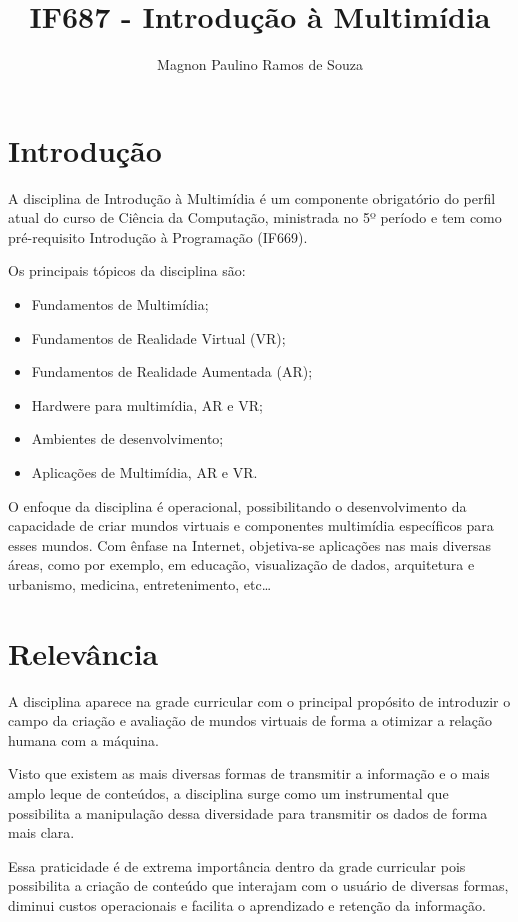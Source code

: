 \documentclass[a4paper]{article}
\title{IF687 - Introdução à Multimídia}
\author{Magnon Paulino Ramos de Souza}
\begin{document}
\maketitle

\section{Introdução}

A disciplina de Introdução à Multimídia\cite{st} é um componente obrigatório do perfil atual do curso de Ciência da Computação, ministrada no 5º período e tem como pré-requisito Introdução à Programação (IF669).

Os principais tópicos da disciplina são:
\begin{itemize}
\item Fundamentos de Multimídia\cite{ch04};
\item Fundamentos de Realidade Virtual\cite{bu03} (VR); 
\item Fundamentos de Realidade Aumentada (AR);
\item Hardwere para multimídia, AR e VR;
\item Ambientes de desenvolvimento;
\item Aplicações de Multimídia, AR e VR\cite{bow05}.
\end{itemize}

O enfoque da disciplina é operacional, possibilitando o desenvolvimento da capacidade de criar mundos virtuais e componentes multimídia específicos para esses mundos. Com ênfase na Internet, objetiva-se aplicações nas mais diversas áreas, como por exemplo, em educação, visualização de dados, arquitetura e urbanismo, medicina, entretenimento, etc\dots


\section{Relevância}

A disciplina aparece na grade curricular com o principal propósito de introduzir o campo da criação e avaliação de mundos virtuais de forma a otimizar a relação humana com a máquina.

Visto que existem as mais diversas formas de transmitir a informação e o mais amplo leque de conteúdos, a disciplina surge como um instrumental que possibilita a manipulação dessa diversidade para transmitir os dados de forma mais clara.

Essa praticidade é de extrema importância dentro da grade curricular pois possibilita a criação de conteúdo que interajam com o usuário de diversas formas, diminui custos operacionais e facilita o aprendizado e retenção da informação.
\end{document}
